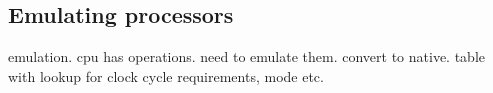 
\subsection{Emulating processors}

emulation. cpu has operations. need to emulate them. convert to native. table with lookup for clock cycle requirements, mode etc.

